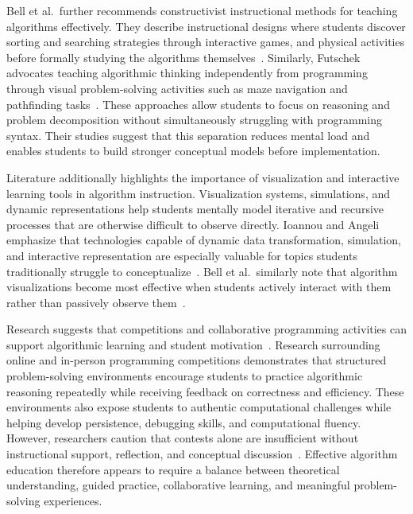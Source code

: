 Bell et al.\
further recommends constructivist instructional methods for teaching algorithms effectively.
They describe instructional designs where students discover sorting and searching strategies through interactive games, and physical activities
  before formally studying the algorithms themselves~\cite{bell2014presenting}.
Similarly, Futschek advocates teaching algorithmic thinking independently from programming through visual problem-solving activities such as maze
  navigation and pathfinding tasks~\cite{futschek2006algorithmic}.
These approaches allow students to focus on reasoning and problem decomposition without simultaneously struggling with programming syntax.
Their studies suggest that this separation reduces mental load and enables students to build stronger conceptual models before implementation.

Literature additionally highlights the importance of visualization and interactive learning tools in algorithm instruction.
Visualization systems, simulations, and dynamic representations help students mentally model iterative and recursive processes that are otherwise
  difficult to observe directly.
Ioannou and Angeli emphasize that technologies capable of dynamic data transformation, simulation, and interactive representation are especially
  valuable for topics students traditionally struggle to conceptualize~\cite{ioan2013}.
Bell et al.\
similarly note that algorithm visualizations become most effective when students actively interact with them rather than passively observe them~\cite{bell2014presenting}.

Research suggests that competitions and collaborative programming activities can support algorithmic learning and student
motivation~\cite{combefis2014programming,cuba2014learning}.
Research surrounding online and in-person programming competitions demonstrates that structured problem-solving environments encourage students to
  practice algorithmic reasoning repeatedly while receiving feedback on correctness and efficiency.
These environments also expose students to authentic computational challenges while helping develop persistence, debugging skills, and computational
  fluency.
However, researchers caution that contests alone are insufficient without instructional support, reflection, and conceptual
discussion~\cite{combefis2014programming}.
Effective algorithm education therefore appears to require a balance between theoretical understanding, guided practice, collaborative learning, and
  meaningful problem-solving experiences.


